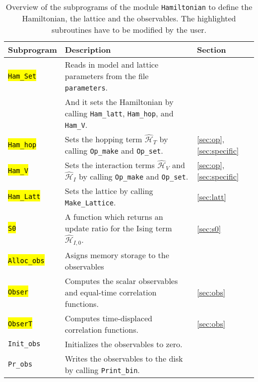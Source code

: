 %
\begin{table}[h]
   \begin{tabular}{l l l}
    Subprogram & Description & Section \\\hline
    \hl{\texttt{Ham\_Set}}  & Reads in model and lattice parameters from the file \texttt{parameters}. \\
                       & And it sets the Hamiltonian by calling \texttt{Ham\_latt}, \texttt{Ham\_hop}, and \texttt{Ham\_V}. & \\
    \hl{\texttt{Ham\_hop}}  & Sets the hopping term  $\hat{\mathcal{H}}_{T}$ by calling \texttt{Op\_make} and \texttt{Op\_set}. & \ref{sec:op}, \ref{sec:specific}\\
    \hl{\texttt{Ham\_V}}    & Sets the interaction terms  $\hat{\mathcal{H}}_{V}$ and $\hat{\mathcal{H}}_{I}$ 
                         by calling \texttt{Op\_make} and \texttt{Op\_set}.& \ref{sec:op}, \ref{sec:specific}\\  
    \hl{\texttt{Ham\_Latt}} & Sets the lattice by calling \texttt{Make\_Lattice}.& \ref{sec:latt}\\
    \hl{\texttt{S0}}        & A function which returns an update ratio for the Ising term $\hat{\mathcal{H}}_{I,0}$. 
    & \ref{sec:s0} \\
    \hl{\texttt{Alloc\_obs}} & Asigns memory storage to the observables & \\
    \hl{\texttt{Obser}}      & Computes the scalar observables and equal-time correlation functions. & \ref{sec:obs} \\
    \hl{\texttt{ObserT}}     & Computes time-displaced correlation functions. & \ref{sec:obs}\\
    \texttt{Init\_obs}  & Initializes the observables to zero. & \\    
    \texttt{Pr\_obs}    & Writes the observables to the disk by calling \texttt{Print\_bin}. 
    
   \end{tabular}
   \caption{Overview of the subprograms of the  module \texttt{Hamiltonian} to define the Hamiltonian, the lattice and the observables. 
   The highlighted subroutines have to be modified by the user.
    \label{table:hamiltonian}}
\end{table}
%

